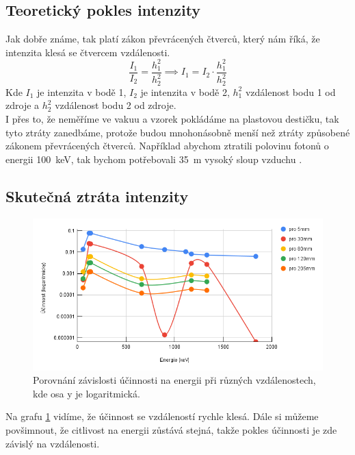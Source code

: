 \documentclass[12pt,a4paper]{article}
\begin{document}
\begin{spacing}{1.5}
\subsection{Teoretický pokles intenzity}
Jak dobře známe, tak platí zákon převrácených čtverců, který nám říká, že intenzita klesá se čtvercem vzdálenosti.
\begin{equation}
	\frac{I_1}{I_2} = \frac{h_1^2}{h_2^2} \implies I_1 = I_2 \cdot \frac{h_1^2}{h_2^2}
\end{equation}
Kde $I_1$ je intenzita v bodě 1, $I_2$ je intenzita v bodě 2, $h_1^2$ vzdálenost bodu 1 od zdroje a $h_2^2$ vzdálenost bodu 2 od zdroje.\\
I přes to, že neměříme ve vakuu a vzorek pokládáme na plastovou destičku, tak tyto ztráty zanedbáme, protože budou mnohonásobně menší než ztráty způsobené zákonem převrácených čtverců. Například abychom ztratili polovinu fotonů o energii \SI{100}{\kilo\electronvolt}, tak bychom potřebovali \SI{35}{\meter} vysoký sloup vzduchu \cite{nuclear_power-gama_radiation}. %
\subsection{Skutečná ztráta intenzity}
\begin{figure}[h]
	\renewcommand\figurename{Graf}
	\centering
	\includegraphics[width=\linewidth]{google2.png}
	\caption{Porovnání závislosti účinnosti na energii při různých vzdálenostech, kde osa y je logaritmická.}
	\label{fig:EFFvsENGvsDIS}
\end{figure} 
Na grafu \ref{fig:EFFvsENGvsDIS} vidíme, že účinnost se vzdáleností rychle klesá. Dále si můžeme povšimnout, \break že citlivost na energii zůstává stejná, takže pokles účinnosti je zde závislý na vzdálenosti.%

\end{spacing}
\end{document}
